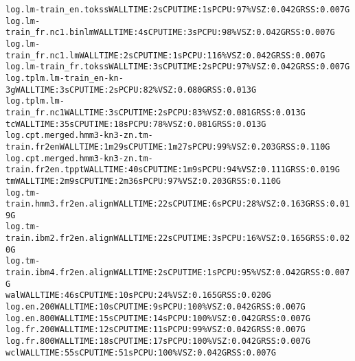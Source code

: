 \documentclass[11pt,letterpaper]{article}
\begin{document}
\begin{tiny}
\begin{alltt}
         log.lm-train_en.tokss                            WALL TIME: 2s       CPU TIME: 1s        PCPU: 97\%    VSZ: 0.042G    RSS: 0.007G
         log.lm-train_fr.nc1.binlm                        WALL TIME: 4s       CPU TIME: 3s        PCPU: 98\%    VSZ: 0.042G    RSS: 0.007G
         log.lm-train_fr.nc1.lm                           WALL TIME: 2s       CPU TIME: 1s        PCPU: 116\%   VSZ: 0.042G    RSS: 0.007G
         log.lm-train_fr.tokss                            WALL TIME: 3s       CPU TIME: 2s        PCPU: 97\%    VSZ: 0.042G    RSS: 0.007G
         log.tplm.lm-train_en-kn-3g                       WALL TIME: 3s       CPU TIME: 2s        PCPU: 82\%    VSZ: 0.080G    RSS: 0.013G
         log.tplm.lm-train_fr.nc1                         WALL TIME: 3s       CPU TIME: 2s        PCPU: 83\%    VSZ: 0.081G    RSS: 0.013G
      tc                                                  WALL TIME: 35s      CPU TIME: 18s       PCPU: 78\%    VSZ: 0.081G    RSS: 0.013G
         log.cpt.merged.hmm3-kn3-zn.tm-train.fr2en        WALL TIME: 1m29s    CPU TIME: 1m27s     PCPU: 99\%    VSZ: 0.203G    RSS: 0.110G
         log.cpt.merged.hmm3-kn3-zn.tm-train.fr2en.tppt   WALL TIME: 40s      CPU TIME: 1m9s      PCPU: 94\%    VSZ: 0.111G    RSS: 0.019G
      tm                                                  WALL TIME: 2m9s     CPU TIME: 2m36s     PCPU: 97\%    VSZ: 0.203G    RSS: 0.110G
         log.tm-train.hmm3.fr2en.align                    WALL TIME: 22s      CPU TIME: 6s        PCPU: 28\%    VSZ: 0.163G    RSS: 0.019G
         log.tm-train.ibm2.fr2en.align                    WALL TIME: 22s      CPU TIME: 3s        PCPU: 16\%    VSZ: 0.165G    RSS: 0.020G
         log.tm-train.ibm4.fr2en.align                    WALL TIME: 2s       CPU TIME: 1s        PCPU: 95\%    VSZ: 0.042G    RSS: 0.007G
      wal                                                 WALL TIME: 46s      CPU TIME: 10s       PCPU: 24\%    VSZ: 0.165G    RSS: 0.020G
         log.en.200                                       WALL TIME: 10s      CPU TIME: 9s        PCPU: 100\%   VSZ: 0.042G    RSS: 0.007G
         log.en.800                                       WALL TIME: 15s      CPU TIME: 14s       PCPU: 100\%   VSZ: 0.042G    RSS: 0.007G
         log.fr.200                                       WALL TIME: 12s      CPU TIME: 11s       PCPU: 99\%    VSZ: 0.042G    RSS: 0.007G
         log.fr.800                                       WALL TIME: 18s      CPU TIME: 17s       PCPU: 100\%   VSZ: 0.042G    RSS: 0.007G
      wcl                                                 WALL TIME: 55s      CPU TIME: 51s       PCPU: 100\%   VSZ: 0.042G    RSS: 0.007G

\end{alltt}
\end{tiny}
\end{document}
